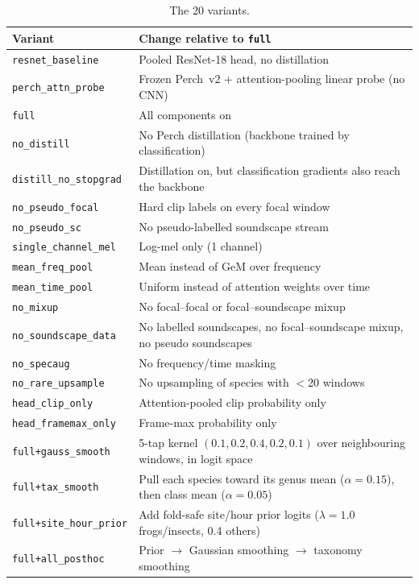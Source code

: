 \documentclass[11pt]{article}
\newcommand{\var}[1]{\texttt{#1}}
\begin{document}
\begin{table}[H]
\centering\small
\caption{The 20 variants.}
\label{tab:variants}
\begin{tabular}{p{4cm}p{10.5cm}}
\toprule
Variant & Change relative to \var{full} \\
\midrule
\var{resnet\_baseline} & Pooled ResNet-18 head, no distillation \\
\var{perch\_attn\_probe} & Frozen Perch~v2 + attention-pooling linear probe (no CNN) \\
\var{full} & All components on \\
\midrule
\var{no\_distill} & No Perch distillation (backbone trained by classification) \\
\var{distill\_no\_stopgrad} & Distillation on, but classification gradients also reach the backbone \\
\var{no\_pseudo\_focal} & Hard clip labels on every focal window \\
\var{no\_pseudo\_sc} & No pseudo-labelled soundscape stream \\
\var{single\_channel\_mel} & Log-mel only (1 channel) \\
\var{mean\_freq\_pool} & Mean instead of GeM over frequency \\
\var{mean\_time\_pool} & Uniform instead of attention weights over time \\
\var{no\_mixup} & No focal--focal or focal--soundscape mixup \\
\var{no\_soundscape\_data} & No labelled soundscapes, no focal--soundscape mixup, no pseudo soundscapes \\
\var{no\_specaug} & No frequency/time masking \\
\var{no\_rare\_upsample} & No upsampling of species with $<$20 windows \\
\midrule
\var{head\_clip\_only} & Attention-pooled clip probability only \\
\var{head\_framemax\_only} & Frame-max probability only \\
\var{full+gauss\_smooth} & 5-tap kernel $(0.1,0.2,0.4,0.2,0.1)$ over neighbouring windows, in logit space \\
\var{full+tax\_smooth} & Pull each species toward its genus mean ($\alpha=0.15$), then class mean ($\alpha=0.05$) \\
\var{full+site\_hour\_prior} & Add fold-safe site/hour prior logits ($\lambda=1.0$ frogs/insects, 0.4 others) \\
\var{full+all\_posthoc} & Prior $\rightarrow$ Gaussian smoothing $\rightarrow$ taxonomy smoothing \\
\bottomrule
\end{tabular}
\end{table}
\end{document}
